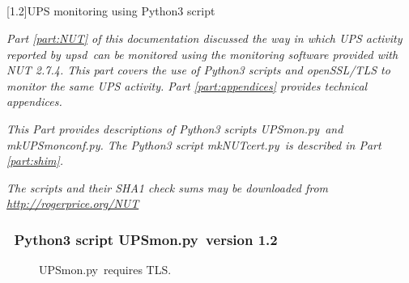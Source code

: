 \documentclass[12pt]{article}
\newlength{\headersep}\setlength{\headersep}{3mm}
\newcommand{\Hsep}{\hspace{\headersep}}
\newcommand{\newcolumn}{\vfill\eject}
\newcommand{\upsd}{\mbox{\textcolor{UPSDCOLOUR}{upsd}}}
\newcommand{\mkNUTcert}{\mbox{\textcolor{MKNUTCERTCOLOUR}{mkNUTcert.py}}}
\newcommand{\UPSmon}{\mbox{\textcolor{UPSMONCOLOUR}{UPSmon.py}}}
\newcommand{\mkUPSmonconf}{\mbox{\textcolor{UPSMONCOLOUR}{mkUPSmonconf.py}}}
\begin{document}
\setcounter{section}{29}
\begin{center}
\part[\hspace{\fill}\textsf{UPS monitoring using Python3 script}\hspace{\fill}]{}\label{part:UPSmon}
\vspace{10mm}
\scalebox{1.0}[1.2]{\textsf{\Huge{UPS monitoring using Python3 script}}}
\vspace{10mm}
\end{center}

\textit{Part \ref{part:NUT} of this documentation discussed the way in which
  UPS activity reported by \upsd\ can be monitored using the monitoring
  software provided with NUT 2.7.4.  This part covers the use of Python3
  scripts and openSSL/TLS to monitor the same UPS activity.  Part
  \ref{part:appendices} provides technical appendices.}

\textit{This Part provides descriptions of Python3 scripts \UPSmon\ and
  \mkUPSmonconf.  The Python3 script \mkNUTcert\ is described in Part
  \ref{part:shim}.}

\textit{The scripts and their SHA1 check sums may be downloaded from
        \href{rogerprice.org/NUT}{http://rogerprice.org/NUT}}

\vspace{10mm}

\section{\Hsep\ Python3 script \UPSmon\ version 1.2}\label{section:Umintro}

\begin{figure}[ht]
\vspace{-6mm}
\begin{center}
\end{center}
\vspace{-6mm}
\begin{center}
\end{center}
\vspace{-6mm}
\caption{\UPSmon\ requires TLS.\label{fig:UPSmon-OB}}
\end{figure}
\end{document}
